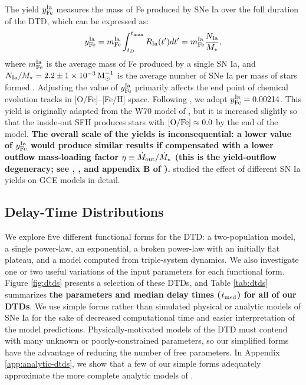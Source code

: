 \documentclass[twocolumn,twocolappendix,linenumbers]{aastex631}
\begin{document}
The yield $y_{\rm Fe}^{\rm Ia}$ measures the mass of Fe produced by SNe Ia over the full duration of the DTD, which can be expressed as:
\begin{equation}
    y_{\rm Fe}^{\rm Ia} = m_{\rm Fe}^{\rm Ia} \int_{t_D}^{t_{\rm max}} R_{\rm Ia}(t')dt' = m_{\rm Fe}^{\rm Ia} \frac{N_{\rm Ia}}{M_\star},
    \label{eq:dtd-integral}
\end{equation}
where $m_{\rm Fe}^{\rm Ia}$ is the average mass of Fe produced by a single SN Ia, and $N_{\rm Ia}/M_\star=2.2\pm1\times10^{-3}\,{\rm M}_\odot^{-1}$ is the average number of SNe Ia per mass of stars formed \citep{MaozMannucci2012-SNeIaReview}. Adjusting the value of $y_{\rm Fe}^{\rm Ia}$ primarily affects the end point of chemical evolution tracks in [O/Fe]--[Fe/H] space. Following , we adopt $y_{\rm Fe}^{\rm Ia}=0.00214$. This yield is originally adapted from the W70 model of \citet{Iwamoto1999-SNIaYields}, but it is increased slightly so that the inside-out SFH produces stars with ${\rm [O/Fe]}\approx 0.0$ by the end of the model. {\bf The overall scale of the yields is inconsequential: a lower value of $y_{\rm Fe}^{\rm Ia}$ would produce similar results if compensated with a lower outflow mass-loading factor $\eta\equiv \dot M_{\rm out}/\dot M_\star$ (this is the yield-outflow degeneracy; see \citealt{Weinberg2023-CCSNYield}, \citealt{Sandford2024-StrongOutflows}, and appendix B of \citealt{Johnson2023-DwarfGalaxyArchaeology}).} \citet{Palla2021-SNIaYield} studied the effect of different SN Ia yields on GCE models in detail.

\subsection{Delay-Time Distributions}
\label{sec:dtd-models}

We explore five different functional forms for the DTD: a two-population model, a single power-law, an exponential, a broken power-law with an initially flat plateau, and a model computed from triple-system dynamics. We also investigate one or two useful variations of the input parameters for each functional form. Figure \ref{fig:dtds} presents a selection of these DTDs, and Table \ref{tab:dtds} summarizes {\bf the parameters and median delay times ($t_{\rm med}$) for all of our DTDs}. We use simple forms rather than simulated physical or analytic models of SNe Ia for the sake of decreased computational time and easier interpretation of the model predictions. Physically-motivated models of the DTD must contend with many unknown or poorly-constrained parameters, so our simplified forms have the advantage of reducing the number of free parameters. In Appendix \ref{app:analytic-dtds}, we show that a few of our simple forms adequately approximate the more complete analytic models of \citet{Greggio2005-AnalyticalRates}. 
\end{document}

